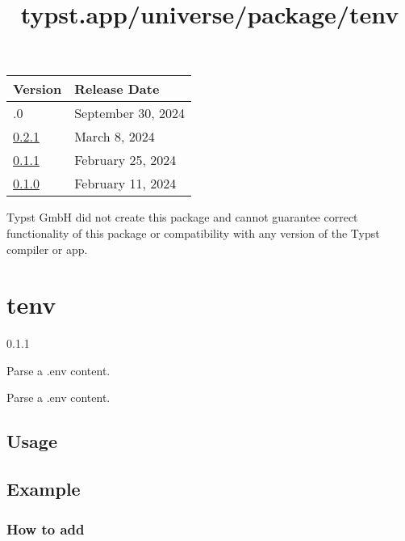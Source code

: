 \begin{longtable}[]{@{}ll@{}}
\toprule\noalign{}
Version & Release Date \\
\midrule\noalign{}
\endhead
\bottomrule\noalign{}
\endlastfoot
0.3.0 & September 30, 2024 \\
\href{https://typst.app/universe/package/note-me/0.2.1/}{0.2.1} & March
8, 2024 \\
\href{https://typst.app/universe/package/note-me/0.1.1/}{0.1.1} &
February 25, 2024 \\
\href{https://typst.app/universe/package/note-me/0.1.0/}{0.1.0} &
February 11, 2024 \\
\end{longtable}

Typst GmbH did not create this package and cannot guarantee correct
functionality of this package or compatibility with any version of the
Typst compiler or app.


\title{typst.app/universe/package/tenv}

\label{banner}
\section{tenv}\label{tenv}

{ 0.1.1 }

Parse a .env content.

\label{readme}
Parse a .env content.

\subsection{Usage}\label{usage}

\begin{Shaded}
\begin{Highlighting}[]

\end{Highlighting}
\end{Shaded}

\subsection{Example}\label{example}


\subsubsection{How to add}\label{how-to-add}

